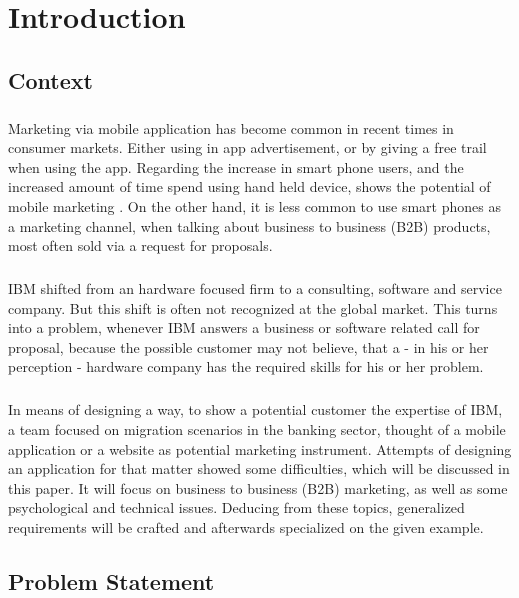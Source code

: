 \chapter{Introduction}
\section{Context}
\paragraph*{}
Marketing via mobile application has become common in recent times in consumer markets. Either using in app advertisement, or by giving a free trail when using the app. Regarding the increase in smart phone users, and the increased amount of time spend using hand held device, shows the potential of mobile marketing . On the other hand, it is less common to use smart phones as a marketing channel, when talking about business to business (B2B) products, most often sold via a request for proposals.
\paragraph*{}
IBM shifted from an hardware focused firm to a consulting, software and service company. But this shift is often not recognized at the global market. This turns into a problem, whenever IBM answers a business or software related call for proposal, because the possible customer may not believe, that a - in his or her perception - hardware company has the required skills for his or her problem.
\paragraph*{}
In means of designing a way, to show a potential customer the expertise of IBM, a team focused on migration scenarios in the banking sector, thought of a mobile application or a website as potential marketing instrument. Attempts of designing an application for that matter showed some difficulties, which will be discussed in this paper. It will focus on business to business (B2B) marketing, as well as some psychological and technical issues. Deducing from these topics, generalized requirements will be crafted and afterwards specialized on the given example. 
\section{Problem Statement}
